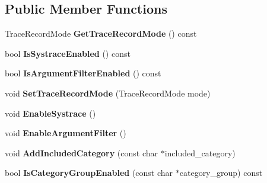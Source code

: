 \subsection*{Public Member Functions}
\begin{DoxyCompactItemize}
\item 
\mbox{\label{classv8_1_1platform_1_1tracing_1_1TraceConfig_a283a7b368c95196efeee809329329c3e}} 
Trace\+Record\+Mode {\bfseries Get\+Trace\+Record\+Mode} () const
\item 
\mbox{\label{classv8_1_1platform_1_1tracing_1_1TraceConfig_a3016e6ecb79bbd8be729d9184cb55295}} 
bool {\bfseries Is\+Systrace\+Enabled} () const
\item 
\mbox{\label{classv8_1_1platform_1_1tracing_1_1TraceConfig_a39512c7461b02ab590aee35754899d3b}} 
bool {\bfseries Is\+Argument\+Filter\+Enabled} () const
\item 
\mbox{\label{classv8_1_1platform_1_1tracing_1_1TraceConfig_ac6843c1347eb720bc3acf4ab82328539}} 
void {\bfseries Set\+Trace\+Record\+Mode} (Trace\+Record\+Mode mode)
\item 
\mbox{\label{classv8_1_1platform_1_1tracing_1_1TraceConfig_ae9291cd355351f989502518179adba23}} 
void {\bfseries Enable\+Systrace} ()
\item 
\mbox{\label{classv8_1_1platform_1_1tracing_1_1TraceConfig_a49ac9f0b03a9b546094af4f3493577bd}} 
void {\bfseries Enable\+Argument\+Filter} ()
\item 
\mbox{\label{classv8_1_1platform_1_1tracing_1_1TraceConfig_a5d5941e02cdfd629b71b043a684bd776}} 
void {\bfseries Add\+Included\+Category} (const char $\ast$included\+\_\+category)
\item 
\mbox{\label{classv8_1_1platform_1_1tracing_1_1TraceConfig_a664f20d4cae11ce74ca8c087d74588cf}} 
bool {\bfseries Is\+Category\+Group\+Enabled} (const char $\ast$category\+\_\+group) const
\end{DoxyCompactItemize}
